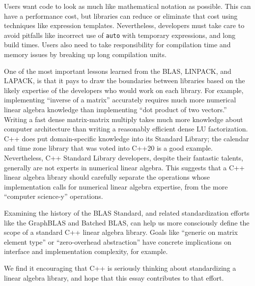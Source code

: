 Users want code to look as much like mathematical notation as
possible.  This can have a performance cost, but libraries can reduce
or eliminate that cost using techniques like expression templates.
Nevertheless, developers must take care to avoid pitfalls like
incorrect use of \texttt{auto} with temporary expressions, and long
build times.  Users also need to take responsibility for compilation
time and memory issues by breaking up long compilation units.

One of the most important lessons learned from the BLAS, LINPACK, and
LAPACK, is that it pays to draw the boundaries between libraries based
on the likely expertise of the developers who would work on each
library.  For example, implementing ``inverse of a matrix'' accurately
requires much more numerical linear algebra knowledge than
implementing ``dot product of two vectors.''  Writing a fast dense
matrix-matrix multiply takes much more knowledge about computer
architecture than writing a reasonably efficient dense LU
factorization.  C++ does put domain-specific knowledge into its
Standard Library; the calendar and time zone library \cite{P0355r7}
that was voted into C++20 is a good example.  Nevertheless, C++
Standard Library developers, despite their fantastic talents,
generally are not experts in numerical linear algebra.  This suggests
that a C++ linear algebra library should carefully separate the
operations whose implementation calls for numerical linear algebra
expertise, from the more ``computer science-y'' operations.

Examining the history of the BLAS Standard, and related
standardization efforts like the GraphBLAS and Batched BLAS, can help
us more consciously define the scope of a standard C++ linear algebra
library.  Goals like ``generic on matrix element type'' or
``zero-overhead abstraction'' have concrete implications on interface
and implementation complexity, for example.

We find it encouraging that C++ is seriously thinking about
standardizing a linear algebra library, and hope that this essay
contributes to that effort.


